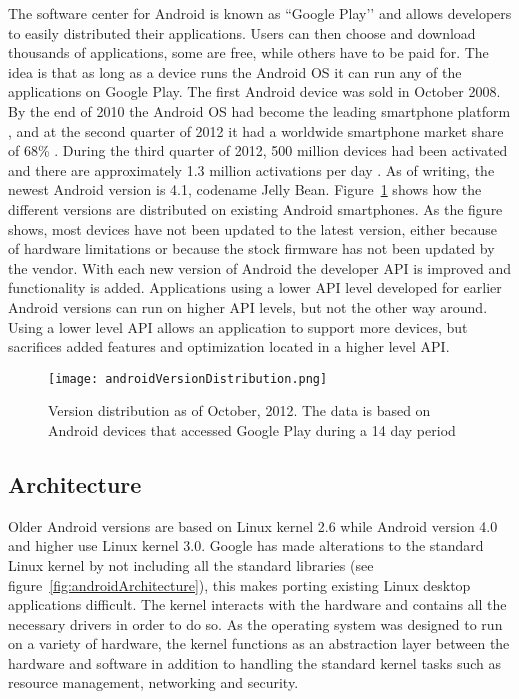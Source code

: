 The software center for Android is known as ``Google Play’’ and allows developers to easily distributed their applications. Users can then choose and download thousands of applications, some are free, while others have to be paid for. The idea is that as long as a device runs the Android OS it can run any of the applications on Google Play. The first Android device was sold in October 2008. By the end of 2010 the Android OS had become the leading smartphone platform \cite{androidLeadingPlatform}, and at the second quarter of 2012 it had a worldwide smartphone market share of 68\% \cite{androidMarketShare}. During the third quarter of 2012, 500 million devices had been activated and there are approximately 1.3 million activations per day \cite{androidDevices}. As of writing, the newest Android version is 4.1, codename Jelly Bean. Figure~\ref{fig:verDist} shows how the different versions are distributed on existing Android smartphones. As the figure shows, most devices have not been updated to the latest version, either because of hardware limitations or because the stock firmware has not been updated by the vendor. With each new version of Android the developer API is improved and functionality is added. Applications using a lower API level developed for earlier Android versions can run on higher API levels, but not the other way around. Using a lower level API allows an application to support more devices, but sacrifices added features and optimization located in a higher level API.

\begin{figure}[h!]
  \centering
    \texttt{[image: androidVersionDistribution.png]}
    \caption{\footnotesize Version distribution as of October, 2012. The data is based on Android devices that accessed Google Play during a 14 day period \cite{androidVersions}}
  \label{fig:verDist}
\end{figure}

\subsection{Architecture}
Older Android versions are based on Linux kernel 2.6 while Android version 4.0 and higher use Linux kernel 3.0. Google has made alterations to the standard Linux kernel by not including all the standard libraries (see figure~\ref{fig:androidArchitecture}), this makes porting existing Linux desktop applications difficult. The kernel interacts with the hardware and contains all the necessary drivers in order to do so. As the operating system was designed to run on a variety of hardware, the kernel functions as an abstraction layer between the hardware and software in addition to handling the standard kernel tasks such as resource management, networking and security.

